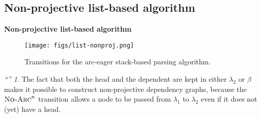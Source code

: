 \documentclass[10pt]{beamer}%
\theoremstyle{remark}
\newtheorem*{myquote}{\large``\hfill ''}
\begin{document}
\subsection{Non-projective list-based algorithm}
\begin{frame}

  \textbf{Non-projective list-based algorithm}

  \begin{figure}[H]
    \centering
    \texttt{[image: figs/list-nonproj.png]}
    \caption{Transitions for the arc-eager stack-based parsing algorithm.}
  \end{figure}

  \begin{myquote}
    The fact that both the head and the dependent are kept in either $\lambda_2$ or $\beta$ makes it \alert{possible to construct non-projective dependency graphs}, because the $\textsc{No-Arc}^n$ transition allows a node to be passed from $\lambda_1$ to $\lambda_2$ even if it does not (yet) have a head.
  \end{myquote}

\end{frame}
\end{document}
